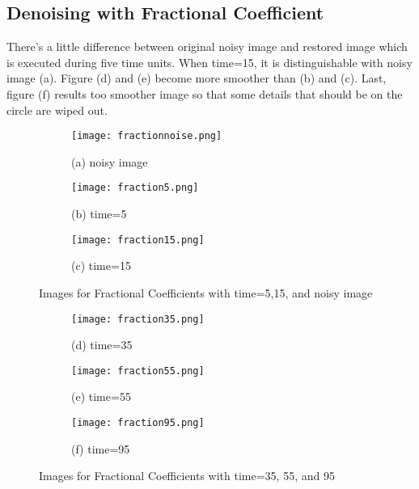 \documentclass[12pt]{report}
\begin{document}
\begin{tableofcontents}
			\subsection{Denoising with Fractional Coefficient}
There's a little difference between original noisy image and restored image which is executed during five time units. When time=15, it is distinguishable with noisy image (a). Figure (d) and (e) become more smoother than (b) and (c). Last, figure (f) results too smoother image so that some details that should be on the circle are wiped out.
            \begin{figure}[H]
				\captionsetup[subfigure]{labelformat=empty}
				\centering
				\begin{subfigure}{0.325\textwidth}
					\texttt{[image: fractionnoise.png]}
					\caption{(a) noisy image}
				\end{subfigure}
				\begin{subfigure}{0.325\textwidth}
					\texttt{[image: fraction5.png]}
					\caption{(b) time=5}
				\end{subfigure}
				\begin{subfigure}{0.325\textwidth}
					\texttt{[image: fraction15.png]}
					\caption{(c) time=15}
				\end{subfigure}
		\caption{Images for Fractional Coefficients with time=5,15, and noisy image}
            \end{figure}
            \begin{figure}[H]
				\captionsetup[subfigure]{labelformat=empty}
				\begin{subfigure}{0.325\textwidth}
					\texttt{[image: fraction35.png]}
					\caption{(d) time=35}
				\end{subfigure}
				\begin{subfigure}{0.325\textwidth}
					\texttt{[image: fraction55.png]}
					\caption{(e) time=55}
				\end{subfigure}
				\begin{subfigure}{0.325\textwidth}
					\texttt{[image: fraction95.png]}
					\caption{(f) time=95}
				\end{subfigure}
		\caption{Images for Fractional Coefficients with time=35, 55, and 95}
			\end{figure}

\end{tableofcontents}
\end{document}
